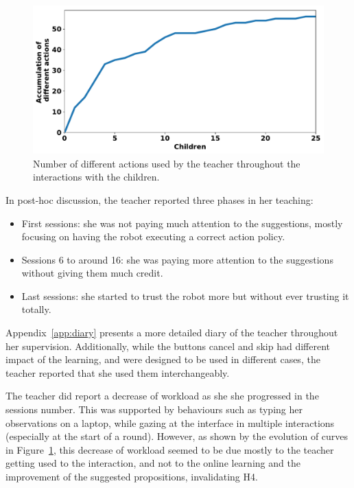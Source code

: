 \begin{figure}[ht]
	\includegraphics[width=.85\linewidth]{./number_actions.pdf}
	\centering
	\caption{Number of different actions used by the teacher throughout the interactions with the children.}
	\label{fig:tutoring_actions}
\end{figure}


In post-hoc discussion, the teacher reported three phases in her teaching: 
\begin{itemize}
	\item First sessions: she was not paying much attention to the suggestions, mostly focusing on having the robot executing a correct action policy.
	\item Sessions 6 to around 16: she was paying more attention to the suggestions without giving them much credit.
	\item Last sessions: she started to trust the robot more but without ever trusting it totally.
\end{itemize}

Appendix~\ref{app:diary} presents a more detailed diary of the teacher throughout her supervision. Additionally, while the buttons cancel and skip had different impact of the learning, and were designed to be used in different cases, the teacher reported that she used them interchangeably.

The teacher did report a decrease of workload as she she progressed in the sessions number. This was supported by behaviours such as typing her observations on a laptop, while gazing at the interface in multiple interactions (especially at the start of a round). However, as shown by the evolution of curves in Figure~\ref{fig:tutoring_actions}, this decrease of workload seemed to be due mostly to the teacher getting used to the interaction, and not to the online learning and the improvement of the suggested propositions, invalidating H4.

